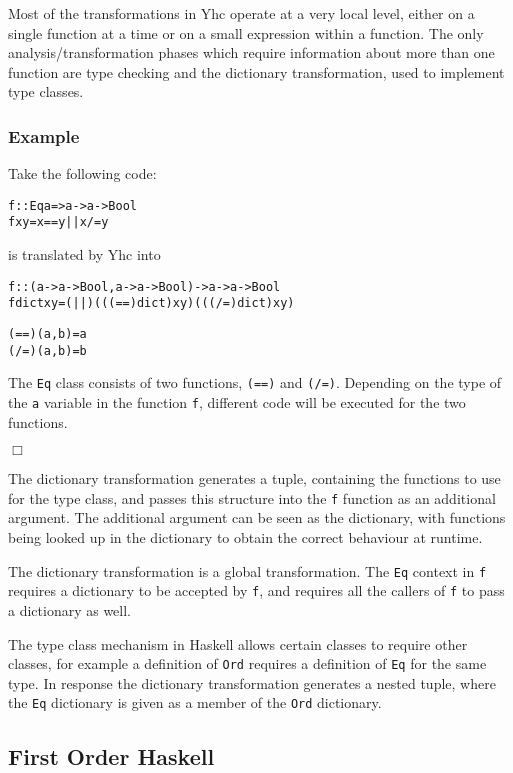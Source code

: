 \documentclass[preprint]{sigplanconf}
\newcommand{\T}[1]{\texttt{#1}}
\newcounter{exmp}
\newcommand{\yesexample}{\subsubsection*{Example \arabic{exmp}}\addtocounter{exmp}{1}}
\newcommand{\noexample}{\hfill$\Box$}
\newenvironment{code}{\begin{alltt}\small}{\end{alltt}}
\begin{document}
Most of the transformations in Yhc operate at a very local level, either on a
single function at a time or on a small expression within a function. The only
analysis/transformation phases which require information about more than one
function are type checking and the dictionary transformation, used to implement
type classes.

\yesexample

Take the following code:

\begin{code}
 f :: Eq a => a -> a -> Bool
 f x y = x == y || x /= y
\end{code}

is translated by Yhc into

\begin{code}
 f :: (a -> a -> Bool, a -> a -> Bool) -> a -> a -> Bool
 f dict x y = (||) (((==) dict) x y) (((/=) dict) x y)

 (==) (a,b) = a
 (/=) (a,b) = b
\end{code}

The \T{Eq} class consists of two functions, \T{(==)} and \T{(/=)}. Depending on
the type of the \T{a} variable in the function \T{f}, different code will be
executed for the two functions.

\noexample



The dictionary transformation generates a tuple, containing the functions to
use for the type class, and passes this structure into the \T{f} function as an
additional argument. The additional argument can be seen as the dictionary,
with functions being looked up in the dictionary to obtain the correct
behaviour at runtime.

The dictionary transformation is a global transformation. The \T{Eq} context in
\T{f} requires a dictionary to be accepted by \T{f}, and requires all the
callers of \T{f} to pass a dictionary as well.

The type class mechanism in Haskell allows certain classes to require other
classes, for example a definition of \T{Ord} requires a definition of \T{Eq}
for the same type. In response the dictionary transformation generates a nested
tuple, where the \T{Eq} dictionary is given as a member of the \T{Ord}
dictionary.

\subsection{First Order Haskell}
\end{document}
